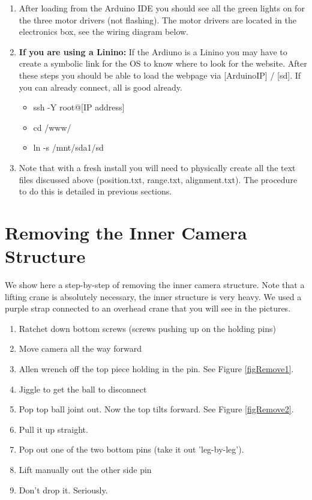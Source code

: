 \documentclass[11pt]{article}
\begin{document}
\begin{enumerate}
\item After loading from the Arduino IDE you should see all the green lights on for the three motor drivers (not flashing).  
The motor drivers are located in the electronics box, see the wiring diagram below.

\item {\textbf{If you are using a Linino:}}  If the Ardiuno is a Linino you may have to create a symbolic link for the OS to know where to look for the website.  
After these steps you should be able to load the webpage via [ArduinoIP] / [sd].  
If you can already connect, all is good already.
	\begin{itemize}
		\item ssh -Y root@[IP address]
		\item cd /www/
		\item ln -s /mnt/sda1/sd
	\end{itemize}
	
\item Note that with a fresh install you will need to physically create all the text files discussed above (position.txt, range.txt, alignment.txt).
	The procedure to do this is detailed in previous sections.
\end{enumerate}


\section{Removing the Inner Camera Structure}
We show here a step-by-step of removing the inner camera structure.  
Note that a lifting crane is absolutely necessary, the inner structure is very heavy.
We used a purple strap connected to an overhead crane that you will see in the pictures.

\begin{enumerate}
\item Ratchet down bottom screws (screws pushing up on the holding pins)
\item Move camera all the way forward
\item Allen wrench off the top piece holding in the pin.  See Figure \ref{figRemove1}.
\item Jiggle to get the ball to disconnect
\item Pop top ball joint out.  Now the top tilts forward.  See Figure \ref{figRemove2}.
\item Pull it up straight.
\item Pop out one of the two bottom pins (take it out 'leg-by-leg'). 
\item Lift manually out the other side pin
\item Don't drop it.  Seriously.
\end{enumerate}
\end{document}

